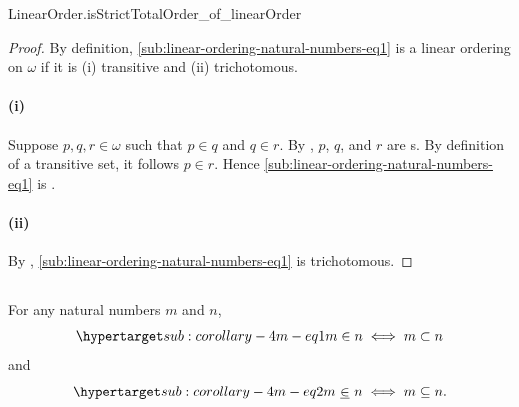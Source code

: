 \documentclass{report}
\newcommand{\ineq}{\,\mathop{\underline{\in}}\,}
\begin{document}
    {LinearOrder.isStrictTotalOrder\_of\_linearOrder}

  \begin{proof}

    By definition, \eqref{sub:linear-ordering-natural-numbers-eq1} is a linear
      ordering on $\omega$ if it is (i) transitive and (ii) trichotomous.

    \paragraph{(i)}%

      Suppose $p, q, r \in \omega$ such that $p \in q$ and $q \in r$.
      By , $p$, $q$, and $r$ are
        s.
      By definition of a transitive set, it follows $p \in r$.
      Hence \eqref{sub:linear-ordering-natural-numbers-eq1} is
        .

    \paragraph{(ii)}%

      By ,
        \eqref{sub:linear-ordering-natural-numbers-eq1} is trichotomous.

  \end{proof}

\subsection{}%

  \begin{corollary}[4M]
    For any natural numbers $m$ and $n$,
      \begin{equation}
        \hyperlabel{sub:corollary-4m-eq1}
        m \in n \iff m \subset n
      \end{equation}
      and
      \begin{equation}
        \hyperlabel{sub:corollary-4m-eq2}
        m \ineq n \iff m \subseteq n.
      \end{equation}
  \end{corollary}
\end{document}
